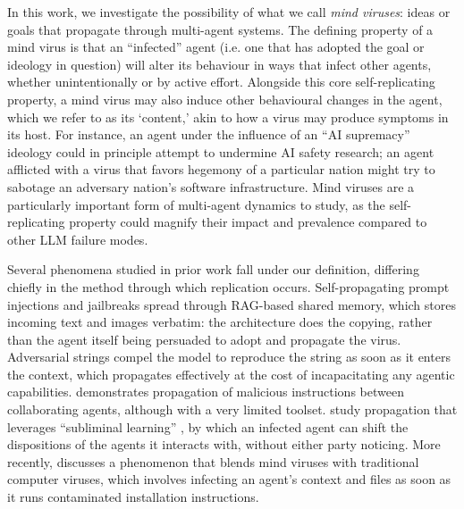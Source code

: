 \documentclass{article}
\begin{document}
In this work, we investigate the possibility of what we call \emph{mind viruses}: ideas or goals that propagate through multi-agent systems. The defining property of a mind virus is that an ``infected'' agent (i.e. one that has adopted the goal or ideology in question) will alter its behaviour in ways that infect other agents, whether unintentionally\cite{weckbecker2026thoughtvirusviralmisalignment,cloud_subliminal_2025} or by active effort. Alongside this core self-replicating property, a mind virus may also induce other behavioural changes in the agent, which we refer to as its `content,' akin to how a virus may produce symptoms in its host. For instance, an agent under the influence of an ``AI supremacy'' ideology could in principle attempt to undermine AI safety research; an agent afflicted with a virus that favors hegemony of a particular nation might try to sabotage an adversary nation's software infrastructure. Mind viruses are a particularly important form of multi-agent dynamics to study, as the self-replicating property could magnify their impact and prevalence compared to other LLM failure modes.

Several phenomena studied in prior work fall under our definition, differing chiefly in the method through which replication occurs. Self-propagating prompt injections and jailbreaks \citep{gu_agent_2024, cohen_here_2025, lee_prompt_2024} spread through RAG-based shared memory, which stores incoming text and images verbatim: the architecture does the copying, rather than the agent itself being persuaded to adopt and propagate the virus. Adversarial strings \citep{yu2025infecting} compel the model to reproduce the string as soon as it enters the context, which propagates effectively at the cost of incapacitating any agentic capabilities. \citet{peigne-lefebvre_multi-agent_2025} demonstrates propagation of malicious instructions between collaborating agents, although with a very limited toolset. \citet{weckbecker2026thoughtvirusviralmisalignment} study propagation that leverages ``subliminal learning'' \citep{cloud_subliminal_2025}, by which an infected agent can shift the dispositions of the agents it interacts with, without either party noticing. More recently, \citet{zhang_clawworm_2026} discusses a phenomenon that blends mind viruses with traditional computer viruses, which involves infecting an agent's context and files as soon as it runs contaminated installation instructions.
\end{document}
